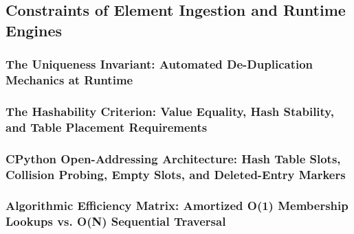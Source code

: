 \subsection{Constraints of Element Ingestion and Runtime Engines}
\subsubsection{The Uniqueness Invariant: Automated De-Duplication Mechanics at Runtime}
\subsubsection{The Hashability Criterion: Value Equality, Hash Stability, and Table Placement Requirements}
\subsubsection{CPython Open-Addressing Architecture: Hash Table Slots, Collision Probing, Empty Slots, and Deleted-Entry Markers}
\subsubsection{Algorithmic Efficiency Matrix: Amortized O(1) Membership Lookups vs. O(N) Sequential Traversal}
